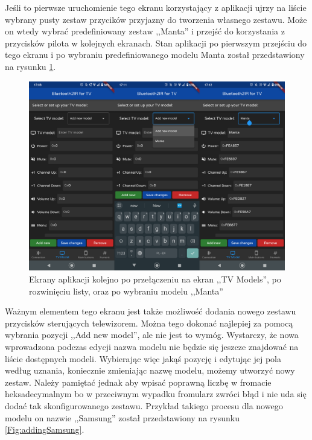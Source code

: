 \documentclass[12pt,twoside]{article}
\begin{document}
Jeśli to pierwsze uruchomienie tego ekranu korzystający z aplikacji ujrzy na liście wybrany pusty zestaw przycików przyjazny do tworzenia własnego zestawu. Może on wtedy wybrać predefiniowany zestaw ,,Manta'' i przejść do korzystania z przycisków pilota w kolejnych ekranach. Stan aplikacji po pierwszym przejściu do tego ekranu i po wybraniu predefiniowanego modelu Manta został przedstawiony na rysunku \ref*{Fig:choosingManta}.
\begin{figure}[ht]
   \centering
   \includegraphics[width=13cm]{images/choosingManta.png}
   \caption{Ekrany aplikacji kolejno po przełączeniu na ekran ,,TV Models'', po rozwinięciu listy, oraz po wybraniu modelu ,,Manta''}
   \label{Fig:choosingManta}
\end{figure}

Ważnym elementem tego ekranu jest także możliwość dodania nowego zestawu przycisków sterujących telewizorem. Można tego dokonać najlepiej za pomocą wybrania pozycji ,,Add new model'', ale nie jest to wymóg. Wystarczy, że nowa wprowadzona podczas edycji nazwa modelu nie będzie się jeszcze znajdować na liście dostępnych modeli. Wybierając więc jakąś pozycję i edytując jej pola według uznania, koniecznie zmieniając nazwę modelu, możemy utworzyć nowy zestaw. Należy pamiętać jednak aby wpisać poprawną liczbę w fromacie heksadecymalnym bo w przeciwnym wypadku fromularz zwróci błąd i nie uda się dodać tak skonfigurowanego zestawu. Przykład takiego procesu dla nowego modelu on nazwie ,,Samsung'' został przedstawiony na rysunku \ref*{Fig:addingSamsung}.
\end{document}
